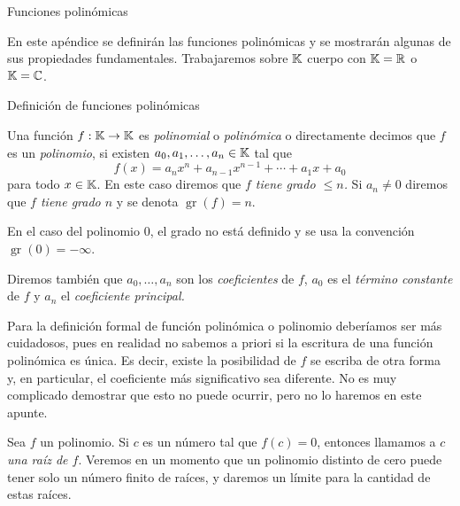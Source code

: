           
    \begin{chapter}{Funciones polinómicas} 
    
        En este apéndice se definirán las funciones polinómicas y se mostrarán algunas de sus propiedades fundamentales. Trabajaremos sobre $\mathbb K$  cuerpo con $\mathbb K=\mathbb R$ o $\mathbb K=\mathbb C$. 
        
        \begin{section}{Definición de funciones polinómicas}\label{seccion-definicion-polinomios}
            
        
        \begin{definicion}
                Una función $f: \mathbb K \to \mathbb K$ es \textit{polinomial} o \textit{polinómica} o directamente decimos que $f$  es  un \textit{polinomio}, si existen $a_0,a_1,\ldots,a_n \in \mathbb K$ tal que
                \begin{equation}\label{eq-funcion-polinomica}
                    f(x) = a_nx^n + a_{n-1}x^{n-1}+\cdots + a_1x +a_0 
                \end{equation}
                para todo $x \in \mathbb K$. En este caso  diremos que  \textit{$f$ tiene grado $\le n$.} Si $a_n \ne 0$ diremos que \textit{$f$ tiene grado $n$} y  se denota $\operatorname{gr}(f)=n$.

                En  el caso del polinomio $0$, el grado no está definido y se usa la convención $\operatorname{gr}(0)=-\infty$. 
        
                Diremos también que  $a_0,\ldots,a_n$ son los \textit{coeficientes} de $f$, $a_0$ es el \textit{término constante} de $f$ y $a_n$  el \textit{coeficiente principal.} 
        \end{definicion}
        
        \begin{obs}
            Para la definición formal de función polinómica o polinomio deberíamos ser más cuidadosos, pues en realidad no sabemos a priori si la escritura de una función polinómica es única. Es  decir,  existe la posibilidad de $f$  se escriba de otra forma y,  en particular, el coeficiente más significativo sea diferente. No es muy complicado demostrar que esto no puede ocurrir, pero no lo haremos en este apunte. 
        \end{obs}
        
        
        Sea $f$ un polinomio. Si $c$ es un número tal que $f (c) = 0$, entonces llamamos a \textit{$c$ una raíz de $f$}. Veremos en un momento que un polinomio distinto de cero puede tener solo un número finito de raíces, y daremos un límite para la cantidad de estas raíces.
        

\end{section}
\end{chapter}
